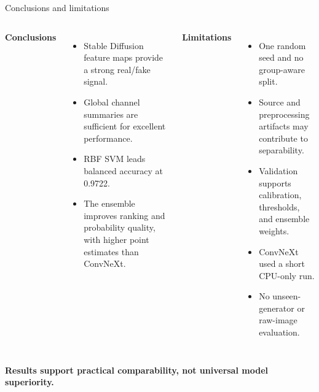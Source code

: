 \documentclass[11pt,aspectratio=169,t]{beamer}
\begin{document}
\begin{frame}{Conclusions and limitations}
  \begin{columns}[T,onlytextwidth]
      {\color{Green}\bfseries Conclusions}\par\vspace{0.25cm}
      \begin{itemize}
        \item Stable Diffusion feature maps provide a strong real/fake signal.
        \item Global channel summaries are sufficient for excellent performance.
        \item RBF SVM leads balanced accuracy at 0.9722.
        \item The ensemble improves ranking and probability quality, with higher point estimates than ConvNeXt.
      \end{itemize}
      {\color{Orange}\bfseries Limitations}\par\vspace{0.25cm}
      \begin{itemize}
        \item One random seed and no group-aware split.
        \item Source and preprocessing artifacts may contribute to separability.
        \item Validation supports calibration, thresholds, and ensemble weights.
        \item ConvNeXt used a short CPU-only run.
        \item No unseen-generator or raw-image evaluation.
      \end{itemize}
  \end{columns}
  \vfill
  {\centering\color{Navy}\bfseries Results support practical comparability, not universal model superiority.\par}
\end{frame}
\end{document}
